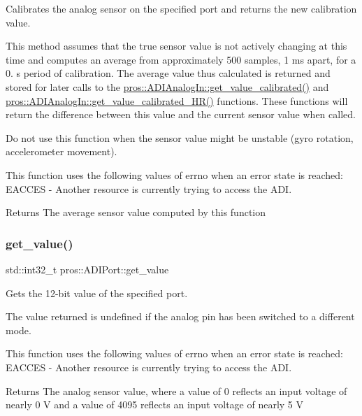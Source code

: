 Calibrates the analog sensor on the specified port and returns the new calibration value. 

This method assumes that the true sensor value is not actively changing at this time and computes an average from approximately 500 samples, 1 ms apart, for a 0. s period of calibration. The average value thus calculated is returned and stored for later calls to the \mbox{\hyperlink{classpros_1_1ADIAnalogIn_a5930ce87c880833bda8cd202613b8d80}{pros\+::\+A\+D\+I\+Analog\+In\+::get\+\_\+value\+\_\+calibrated()}} and \mbox{\hyperlink{classpros_1_1ADIAnalogIn_a65bfed175ed1b0efce4566e78e7f9473}{pros\+::\+A\+D\+I\+Analog\+In\+::get\+\_\+value\+\_\+calibrated\+\_\+\+H\+R()}} functions. These functions will return the difference between this value and the current sensor value when called.

Do not use this function when the sensor value might be unstable (gyro rotation, accelerometer movement).

This function uses the following values of errno when an error state is reached\+: E\+A\+C\+C\+ES -\/ Another resource is currently trying to access the A\+DI.

\begin{DoxyReturn}{Returns}
The average sensor value computed by this function 
\end{DoxyReturn}
\mbox{\label{classpros_1_1ADIAnalogIn_ac79b5fd3ce67ae6ffc4b1fbbb306e997}} 
\subsubsection{\texorpdfstring{get\_value()}{get\_value()}}
{\footnotesize\ttfamily std\+::int32\+\_\+t pros\+::\+A\+D\+I\+Port\+::get\+\_\+value}



Gets the 12-\/bit value of the specified port. 

The value returned is undefined if the analog pin has been switched to a different mode.

This function uses the following values of errno when an error state is reached\+: E\+A\+C\+C\+ES -\/ Another resource is currently trying to access the A\+DI.

\begin{DoxyReturn}{Returns}
The analog sensor value, where a value of 0 reflects an input voltage of nearly 0 V and a value of 4095 reflects an input voltage of nearly 5 V 
\end{DoxyReturn}
\mbox{\label{classpros_1_1ADIAnalogIn_a5930ce87c880833bda8cd202613b8d80}} 
